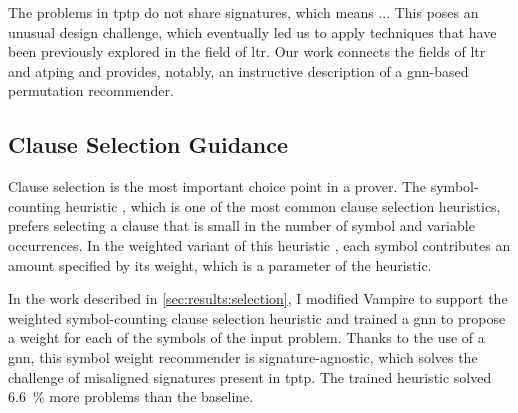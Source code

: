 
The problems in \gls{tptp} do not share \glspl{signature},
which means ...
This poses an unusual design challenge,
which eventually led us to apply techniques that have been previously explored in the field of \gls{ltr}.
Our work connects the fields of \gls{ltr} and \gls{atping} and provides, notably, an instructive description of a \acrshort{gnn}-based permutation recommender.

\subsection{Clause Selection Guidance}
\label{sec:contrib:ClauseSelection}


Clause selection is the most important choice point in a prover.
The symbol-counting heuristic \cite{DBLP:conf/cade/SchulzM16}, which is one of the most common clause selection heuristics,
prefers selecting a clause that is small in the number of symbol and variable occurrences.
In the weighted variant of this heuristic \cite{E-manual},
each symbol contributes an amount specified by its weight,
which is a parameter of the heuristic.

In the work described in \cref{sec:results:selection},
I modified Vampire to support the weighted symbol-counting clause selection heuristic
and trained a \gls{gnn} to propose a weight for each of the symbols of the input problem.
Thanks to the use of a \gls{gnn}, this symbol weight recommender is signature-agnostic,
which solves the challenge of misaligned signatures present in \gls{tptp}.
The trained heuristic solved \SI{6.6}{\percent} more problems than the baseline.


